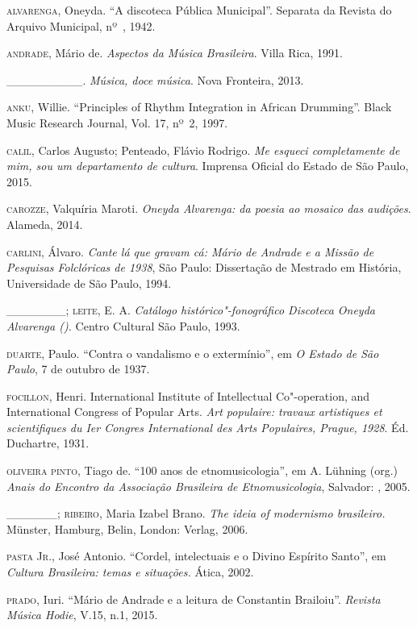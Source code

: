 \begin{Parskip}
\textsc{alvarenga}, Oneyda. ``A discoteca Pública Municipal''. Separata da
Revista do Arquivo Municipal, nº~, 1942.

\textsc{andrade}, Mário de. \emph{Aspectos da Música Brasileira}. Villa Rica,
1991.

\_\_\_\_\_\_\_\_\_. \emph{Música, doce música}. Nova Fronteira, 2013.

\textsc{anku}, Willie. ``Principles of Rhythm Integration in African Drumming''.
Black Music Research Journal, Vol. 17, nº~2, 1997.

\textsc{calil}, Carlos Augusto; Penteado, Flávio Rodrigo. \emph{Me esqueci
completamente de mim, sou um departamento de cultura}. Imprensa Oficial
do Estado de São Paulo, 2015.

\textsc{carozze}, Valquíria Maroti. \emph{Oneyda Alvarenga: da poesia ao mosaico
das audições}. Alameda, 2014.

\textsc{carlini}, Álvaro. \emph{Cante lá que gravam cá: Mário de Andrade e a
Missão de Pesquisas Folclóricas de 1938}, São Paulo: Dissertação de
Mestrado em História, Universidade de São Paulo, 1994.

\_\_\_\_\_\_\_; \textsc{leite}, E. A. \emph{Catálogo histórico"-fonográfico
Discoteca Oneyda Alvarenga ().} Centro Cultural São Paulo, 1993.

\textsc{duarte}, Paulo. ``Contra o vandalismo e o extermínio'', em \emph{O Estado
de São Paulo}, 7 de outubro de 1937.

\textsc{focillon}, Henri. International Institute of Intellectual Co"-operation,
and International Congress of Popular Arts. \emph{Art populaire: travaux
artistiques et scientifiques du Ier Congres International des Arts
Populaires, Prague, 1928}. Éd. Duchartre, 1931.

\textsc{oliveira pinto}, Tiago de. ``100 anos de etnomusicologia'', em A. Lühning
(org.) \emph{Anais do  Encontro da Associação Brasileira de
Etnomusicologia}, Salvador: , 2005.

\_\_\_\_\_\_; \textsc{ribeiro}, Maria Izabel Brano. \emph{The ideia of modernismo
brasileiro.} Münster, Hamburg, Belin, London:  Verlag, 2006.

\textsc{pasta Jr.}, José Antonio. ``Cordel, intelectuais e o Divino Espírito
Santo'', em \emph{Cultura Brasileira: temas e situações.} Ática, 2002.

\textsc{prado}, Iuri. ``Mário de Andrade e a leitura de Constantin Brailoiu''.
\emph{Revista Música Hodie}, V.15, n.1, 2015.


\end{Parskip}
